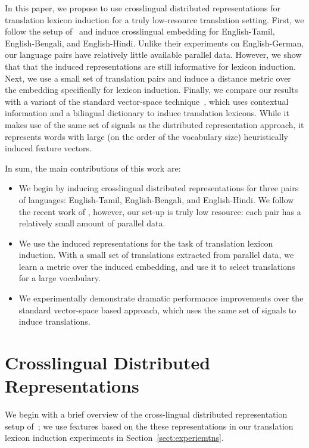 \documentclass[11pt,letterpaper]{article}
\newcommand{\secref}[1]{Section~\ref{#1}}
\begin{document}
In this paper, we propose to use crosslingual distributed representations for translation lexicon induction for a truly low-resource translation setting.  First, we follow the setup of~\cite{Klementiev-et-al:COLING2012} and induce crosslingual embedding for English-Tamil, English-Bengali, and English-Hindi.  Unlike their experiments on English-German, our language pairs have relatively little available parallel data.  However, we show that that the induced representations are still informative for lexicon induction.  Next, we use a small set of translation pairs and induce a distance metric over the embedding specifically for lexicon induction.  Finally, we compare our results with a variant of the standard vector-space technique~\cite{Fung:1998}, which uses contextual information and a bilingual dictionary to induce translation lexicons.  While it makes use of the same set of signals as the distributed representation approach, it represents words with large (on the order of the vocabulary size) heuristically induced feature vectors.

In sum, the main contributions of this work are:

\begin{itemize}
  \item We begin by inducing crosslingual distributed representations for three pairs of languages: English-Tamil, English-Bengali, and English-Hindi.  We follow the recent work of , however, our set-up is truly low resource: each pair has a relatively small amount of parallel data.
  \item We use the induced representations for the task of translation lexicon induction.  With a small set of translations extracted from parallel data, we learn a metric over the induced embedding, and use it to select translations for a large vocabulary.
  \item We experimentally demonstrate dramatic performance improvements over the standard vector-space based approach, which uses the same set of signals to induce translations.
\end{itemize}

\section{Crosslingual Distributed Representations} \label{sect:background}

We begin with a brief overview of the cross-lingual distributed representation setup of~; we use features based on the these representations in our translation lexicon induction experiments in \secref{sect:experiemtns}. 
\end{document}
